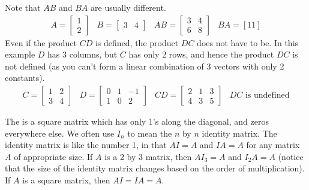 \begin{example} 
Note that $AB$ and $BA$ are usually different.
$$\begin{array}{cccc}
A=\begin{bmatrix} 1\\2\end{bmatrix}&
B=\begin{bmatrix} 3&4\end{bmatrix}&
AB= \begin{bmatrix} 3&4\\6&8\end{bmatrix} &
BA = [11]\end{array}
$$
Even if the product $CD$ is defined, the product $DC$ does not have to be.  In this example $D$ has 3 columns, but $C$ has only 2 rows, and hence the product $DC$ is not defined (as you can't form a linear combination of 3 vectors with only 2 constants).
$$
\begin{array}{cccc}
C =\begin{bmatrix} 1&2\\3&4\end{bmatrix}&
D =\begin{bmatrix} 0&1&-1\\1&0&2\end{bmatrix}&
CD =\begin{bmatrix} 2&1&3\\4&3&5\end{bmatrix}&
DC \text{ is undefined}
\end{array}$$
\end{example}

The  is a square matrix which has only 1's along the diagonal, and zeros everywhere else. We often use $I_n$ to mean the $n$ by $n$ identity matrix. The identity matrix is like the number 1, in that $AI=A$ and $IA=A$ for any matrix $A$ of appropriate size.  If $A$ is a 2 by 3 matrix, then $AI_3=A$ and $I_2A=A$ (notice that the size of the identity matrix changes based on the order of multiplication).  If $A$ is a square matrix, then $AI=IA=A$.

